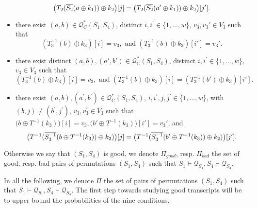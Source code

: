 \begin{definition}
\begin{itemize}
		$$\big(T_2(\overline{S_2}(a\oplus k_1))\oplus k_2\big)[j]=\big(T_2(\overline{S_2}(a'\oplus k_1))\oplus k_2\big)[j'].
		$$
		\item[\cseven]
		there exist $(a, b) \in \mathcal{Q}_{C}^{*}\left(S_{1}, S_{4}\right)$, distinct $i, i^{\prime}\in\{1, \ldots, w\}$, $v_{3},v_{3}' \in V_{3}$ such that
		$$\left(T_{3}^{-1}\left(b\right) \oplus k_{3}\right)[i] = v_3,\text{ and }
		\left(T_{3}^{-1}\left(b\right) \oplus k_{3}\right)[i'] = v_3'.$$
		\item[\ceight]
		there exist distinct $(a, b),(a',b') \in \mathcal{Q}_{C}^{*}\left(S_{1}, S_{4}\right)$, distinct $i, i^{\prime}\in\{1, \ldots, w\}$, $v_{3} \in V_{3}$ such that
		$$\left(T_{3}^{-1}\left(b\right) \oplus k_{3}\right)[i] = v_3,\text{ and }
		\left(T_{3}^{-1}\left(b\right) \oplus k_{3}\right)[i] =\left(T_{3}^{-1}\left(b'\right) \oplus k_{3}\right)[i'].$$
		\item[\cnine]
		there exist $(a, b), (a^{\prime}, b^{\prime}) \in \mathcal{Q}_{C}^{*}\left(S_{1}, S_{4}\right)$, $i, i^{\prime}, j, j^{\prime} \in\{1, \ldots, w\}$, with $(b, j) \neq \left(b^{\prime}, j^{\prime}\right)$, $v_{3},v_{3}^{\prime} \in V_{3}$ such that $\big(b \oplus T^{-1}(k_3)\big)[i] = v_3, \big(b' \oplus T^{-1}(k_3)\big)[i'] = v_3'$, and
		$$\big(T^{-1}(\overline{S_3^{-1}}(b \oplus T^{-1}(k_3))\oplus k_2)\big)[j]=\big(T^{-1}(\overline{S_3^{-1}}(b' \oplus T^{-1}(k_3))\oplus k_2)\big)[j'].
		$$
	\end{itemize}
	Otherwise we say that $(S_{1}, S_{4})$ is good, we denote $\Pi_{good}$, resp. $\Pi_{bad}$ the set of good, resp. bad pairs of permutations $(S_{1}, S_{4})$ such that $S_{1} \vdash \mathcal{Q}_{S_{1}}, S_{4} \vdash \mathcal{Q}_{S_{4}}$.
\end{definition}




In all the following, we denote \emph{$\Pi$} the set of pairs of permutations $(S_{1}, S_{4})$ such that $S_{1} \vdash \mathcal{Q}_{S_{1}}, S_{4} \vdash \mathcal{Q}_{S_{4}}$. The first step towards studying good transcripts will be to upper bound the probabilities of the nine conditions.





